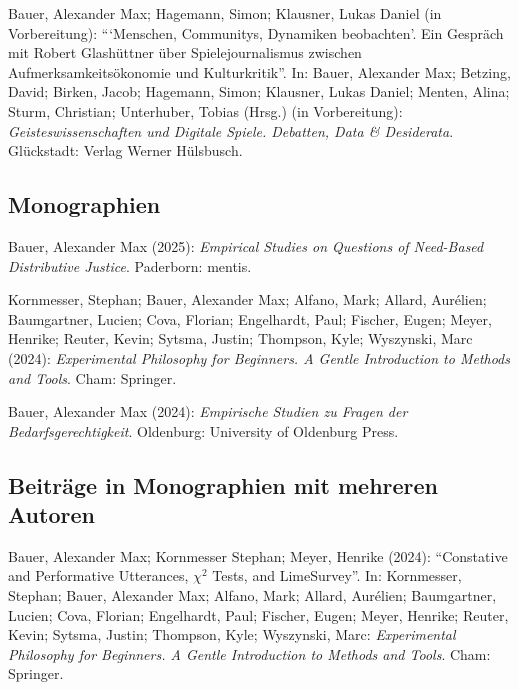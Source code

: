 \documentclass[a4paper,10pt]{article}
\newenvironment{literature}{%
   \parskip6pt\parindent0pt\raggedright
   \def\lititem{\hangindent=1cm\hangafter1}}{%
   \par\ignorespaces}
\begin{document}
\begin{literature}
\lititem Bauer, Alexander Max; Hagemann, Simon; Klausner, Lukas Daniel (in Vorbereitung): \enquote{\enquote{Menschen, Communitys, Dynamiken beobachten}. Ein Gespräch mit Robert Glashüttner über Spielejournalismus zwischen Aufmerksamkeitsökonomie und Kulturkritik}. In: Bauer, Alexander Max; Betzing, David; Birken, Jacob; Hagemann, Simon; Klausner, Lukas Daniel; Menten, Alina; Sturm, Christian; Unterhuber, Tobias (Hrsg.) (in Vorbereitung): \textit{Geisteswissenschaften und Digitale Spiele. Debatten, Data \& Desiderata}. Glückstadt: Verlag Werner Hülsbusch.
\end{literature}


\subsection*{Monographien}
\begin{literature}
\lititem Bauer, Alexander Max (2025): \textit{Empirical Studies on Questions of Need-Based Distributive Justice}. Paderborn: mentis.

\lititem Kornmesser, Stephan; Bauer, Alexander Max; Alfano, Mark; Allard, Aurélien; Baumgartner, Lucien; Cova, Florian; Engelhardt, Paul; Fischer, Eugen; Meyer, Henrike; Reuter, Kevin; Sytsma, Justin; Thompson, Kyle; Wyszynski, Marc (2024): \textit{Experimental Philosophy for Beginners. A Gentle Introduction to Methods and Tools}. Cham: Springer.

\lititem Bauer, Alexander Max (2024): \textit{Empirische Studien zu Fragen der Bedarfsgerechtigkeit}. Oldenburg: University of Oldenburg Press.
\end{literature}


\subsection*{Beiträge in Monographien mit mehreren Autoren}
\begin{literature}
\lititem Bauer, Alexander Max; Kornmesser Stephan; Meyer, Henrike (2024): \enquote{Constative and Performative Utterances, $\chi^2$ Tests, and LimeSurvey}. In: Kornmesser, Stephan; Bauer, Alexander Max; Alfano, Mark; Allard, Aurélien; Baumgartner, Lucien; Cova, Florian; Engelhardt, Paul; Fischer, Eugen; Meyer, Henrike; Reuter, Kevin; Sytsma, Justin; Thompson, Kyle; Wyszynski, Marc: \textit{Experimental Philosophy for Beginners. A Gentle Introduction to Methods and Tools}. Cham: Springer.
\end{literature}
\end{document}
